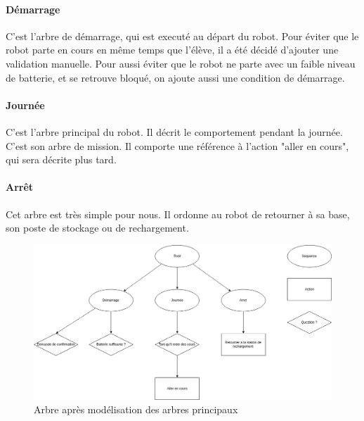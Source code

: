 \documentclass[titlepage]{article}
\begin{document}
	\paragraph{Démarrage}
	C'est l'arbre de démarrage, qui est executé au départ du robot. Pour éviter que le robot parte en cours en même temps que l'élève, il a été décidé d'ajouter une validation manuelle. Pour aussi éviter que le robot ne parte avec un faible niveau de batterie, et se retrouve bloqué, on ajoute aussi une condition de démarrage.
	\paragraph{Journée}
	C'est l'arbre principal du robot. Il décrit le comportement pendant la journée. C'est son arbre de mission. Il comporte une référence à l'action "aller en cours", qui sera décrite plus tard.
	\paragraph{Arrêt}
	Cet arbre est très simple pour nous. Il ordonne au robot de retourner à sa base, son poste de stockage ou de rechargement.
	\\
	\begin{figure}[h!]
		\centering
		\includegraphics[width=\linewidth]{img/BT_4.png}
		\caption{Arbre après modélisation des arbres principaux}
		\label{fig:exemple_3}
	\end{figure}
\end{document}
